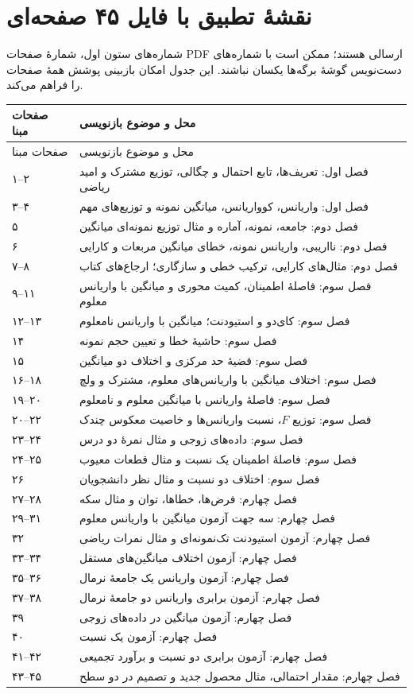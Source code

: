 \documentclass[12pt,a4paper,oneside]{report}
\begin{document}
\section{نقشهٔ تطبیق با فایل ۴۵ صفحه‌ای}
شماره‌های ستون اول، شمارهٔ صفحات PDF ارسالی هستند؛ ممکن است با شماره‌های دست‌نویس گوشهٔ برگه‌ها یکسان نباشند. این جدول امکان بازبینی پوشش همهٔ صفحات را فراهم می‌کند.
\begin{center}\small
\renewcommand{\arraystretch}{1.2}
\begin{longtable}{>{\centering\arraybackslash}p{22mm} p{113mm}}
\toprule
صفحات مبنا & محل و موضوع بازنویسی\\
\midrule\endfirsthead
\toprule صفحات مبنا & محل و موضوع بازنویسی\\\midrule\endhead
۱–۲ & فصل اول: تعریف‌ها، تابع احتمال و چگالی، توزیع مشترک و امید ریاضی\\
۳–۴ & فصل اول: واریانس، کوواریانس، میانگین نمونه و توزیع‌های مهم\\
۵ & فصل دوم: جامعه، نمونه، آماره و مثال توزیع نمونه‌ای میانگین\\
۶ & فصل دوم: نااریبی، واریانس نمونه، خطای میانگین مربعات و کارایی\\
۷–۸ & فصل دوم: مثال‌های کارایی، ترکیب خطی و سازگاری؛ ارجاع‌های کتاب\\
۹–۱۱ & فصل سوم: فاصلهٔ اطمینان، کمیت محوری و میانگین با واریانس معلوم\\
۱۲–۱۳ & فصل سوم: کای‌دو و استیودنت؛ میانگین با واریانس نامعلوم\\
۱۴ & فصل سوم: حاشیهٔ خطا و تعیین حجم نمونه\\
۱۵ & فصل سوم: قضیهٔ حد مرکزی و اختلاف دو میانگین\\
۱۶–۱۸ & فصل سوم: اختلاف میانگین با واریانس‌های معلوم، مشترک و ولچ\\
۱۹–۲۰ & فصل سوم: فاصلهٔ واریانس با میانگین معلوم و نامعلوم\\
۲۰–۲۲ & فصل سوم: توزیع $F$، نسبت واریانس‌ها و خاصیت معکوس چندک\\
۲۳–۲۴ & فصل سوم: داده‌های زوجی و مثال نمرهٔ دو درس\\
۲۴–۲۵ & فصل سوم: فاصلهٔ اطمینان یک نسبت و مثال قطعات معیوب\\
۲۶ & فصل سوم: اختلاف دو نسبت و مثال نظر دانشجویان\\
۲۷–۲۸ & فصل چهارم: فرض‌ها، خطاها، توان و مثال سکه\\
۲۹–۳۱ & فصل چهارم: سه جهت آزمون میانگین با واریانس معلوم\\
۳۲ & فصل چهارم: آزمون استیودنت تک‌نمونه‌ای و مثال نمرات ریاضی\\
۳۳–۳۴ & فصل چهارم: آزمون اختلاف میانگین‌های مستقل\\
۳۵–۳۶ & فصل چهارم: آزمون واریانس یک جامعهٔ نرمال\\
۳۷–۳۸ & فصل چهارم: آزمون برابری واریانس دو جامعهٔ نرمال\\
۳۹ & فصل چهارم: آزمون میانگین در داده‌های زوجی\\
۴۰ & فصل چهارم: آزمون یک نسبت\\
۴۱–۴۲ & فصل چهارم: آزمون برابری دو نسبت و برآورد تجمیعی\\
۴۳–۴۵ & فصل چهارم: مقدار احتمالی، مثال محصول جدید و تصمیم در دو سطح\\
\bottomrule
\end{longtable}
\end{center}
\endgroup
\end{document}
